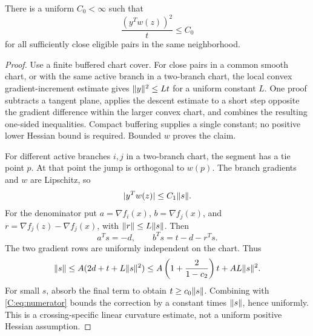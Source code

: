 \begin{lemma}\label{C:lem:secant}
There is a uniform $C_0<\infty$ such that
\[
 \frac{(y^Tw(z))^2}{t}\le C_0
\]
for all sufficiently close eligible pairs in the same neighborhood.
\end{lemma}
\begin{proof}
Use a finite buffered chart cover. For close pairs in a common smooth chart, or with the same active branch in a two-branch chart, the local convex gradient-increment estimate gives $\lVert y\rVert^2\le L t$ for a uniform constant $L$. One proof subtracts a tangent plane, applies the descent estimate to a short step opposite the gradient difference within the larger convex chart, and combines the resulting one-sided inequalities. Compact buffering supplies a single constant; no positive lower Hessian bound is required. Bounded $w$ proves the claim.

For different active branches $i,j$ in a two-branch chart, the segment has a tie point $p$. At that point the jump is orthogonal to $w(p)$. The branch gradients and $w$ are Lipschitz, so
\begin{equation}\label{C:eq:numerator}
 |y^Tw(z)|\le C_1\lVert s\rVert.
\end{equation}
For the denominator put $a=\nabla f_i(x)$, $b=\nabla f_j(x)$, and $r=\nabla f_j(z)-\nabla f_j(x)$, with $\lVert r\rVert\le L\lVert s\rVert$. Then
\[
 a^Ts=-d,\qquad b^Ts=t-d-r^Ts.
\]
The two gradient rows are uniformly independent on the chart. Thus
\[
 \lVert s\rVert\le A(2d+t+L\lVert s\rVert^2)
 \le A\left(1+\frac{2}{1-c_2}\right)t+AL\lVert s\rVert^2.
\]
For small $s$, absorb the final term to obtain $t\ge c_0\lVert s\rVert$. Combining with \eqref{C:eq:numerator} bounds the correction by a constant times $\lVert s\rVert$, hence uniformly. This is a crossing-specific linear curvature estimate, not a uniform positive Hessian assumption.
\end{proof}


\setcounter{section}{5}
\setcounter{theorem}{7}
\setcounter{equation}{15}

